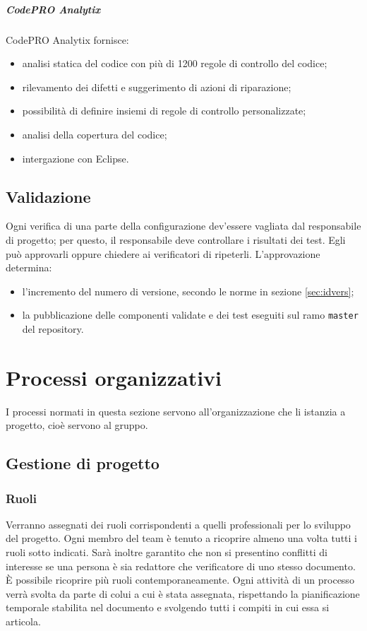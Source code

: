 		\subparagraph{CodePRO Analytix}
		CodePRO Analytix fornisce:
		\begin{itemize}
			\item analisi statica del codice con più di 1200 regole di controllo del codice;
			\item rilevamento dei difetti e suggerimento di azioni di riparazione;
			\item possibilità di definire insiemi di regole di controllo personalizzate;
			\item analisi della copertura del codice;
			\item intergazione con Eclipse.
		\end{itemize}


\subsection{Validazione}
Ogni verifica di una parte della configurazione dev'essere vagliata dal responsabile di progetto; per questo, il responsabile deve controllare i risultati dei test. Egli può approvarli oppure chiedere ai verificatori di ripeterli. L'approvazione determina:
\begin{itemize}
	\item l'incremento del numero di versione, secondo le norme in sezione \ref{sec:idvers};
	\item la pubblicazione delle componenti validate e dei test eseguiti sul ramo \texttt{master} del repository.
\end{itemize}





\section{Processi organizzativi} \label{sec:organizzativi}
I processi normati in questa sezione servono all'organizzazione che li istanzia a progetto, cioè servono al gruppo.


\subsection{Gestione di progetto}

\subsubsection{Ruoli} \label{sec:ruoli}
Verranno assegnati dei ruoli corrispondenti a quelli professionali per lo sviluppo del progetto. Ogni membro del team è tenuto a ricoprire almeno una volta tutti i ruoli sotto indicati. Sarà inoltre garantito che non si presentino conflitti di interesse se una persona è sia redattore che verificatore di uno stesso documento. È possibile ricoprire più ruoli contemporaneamente.
Ogni attività di un processo verrà svolta da parte di colui a cui è stata assegnata, rispettando la pianificazione temporale stabilita nel documento \PdP{} e svolgendo tutti i compiti in cui essa si articola.
